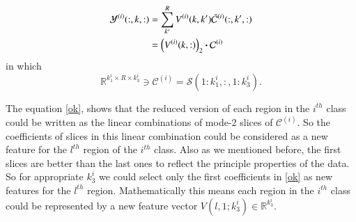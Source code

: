 \documentclass[preprint,12pt]{elsarticle}
\newcommand{\trans}{\mathsf{T}}
\begin{document}
\begin{align}
\label{ok}
{\mathcal{Y}}^{(i)}(:,k,:) &= \sum_{k'}^{R} V^{(i)}(k,k')\bar{\mathcal{C}}^{(i)}(:,k',:) \notag
\\&= \left( V^{(i)}(k,:)\right)_2 \boldsymbol{\cdot} {\mathcal{C}}^{(i)}
\end{align}
in which 
\[
\mathbb{R}^{k_1^i\times R \times k_3^i}\ni {\mathcal{C}}^{(i)} = \mathcal{S}(1:k_1^i,:,1:k_3^i).
\]

The equation \eqref{ok}, shows that the reduced version of each region in the $i^{th}$ class could be
written as the linear combinations of  mode-2 slices of $\mathcal{C}^{(i)}$. So the coefficients of slices in this linear combination could be considered as a new feature for the $l^{th}$ region of the $i^{th}$ class. Also as we mentioned before, the first slices are better than the last ones to reflect the principle properties of the data. So for appropriate $k_3^i$ we could select only the first coefficients in \eqref{ok} as  new features for the $l^{th}$ region. Mathematically this means each region  in the $i^{th}$ class could be represented by a new feature vector $V(l,1;k_3^i)\in \mathbb{R}^{k_3^i}$.   
\end{document}
